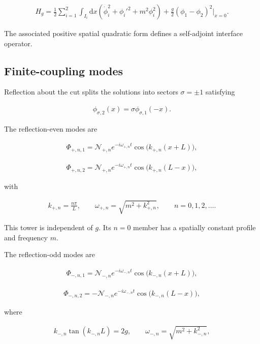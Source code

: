 \begin{align}
H_g
=\frac12\sum_{i=1}^2\int_{I_i}\mathrm dx
\left(\dot\phi_i^2+\phi_i'^2+m^2\phi_i^2\right)
+\frac g2(\phi_1-\phi_2)^2\big|_{x=0}.
\end{align}

The associated positive spatial quadratic form defines a self-adjoint interface operator.

\subsection{Finite-coupling modes}\label{subsec:interval-modes}

Reflection about the cut splits the solutions into sectors $\sigma=\pm1$ satisfying

\begin{align}
\phi_{\sigma,2}(x)=\sigma\phi_{\sigma,1}(-x).
\end{align}

The reflection-even modes are

\begin{align}
\Phi_{+,n,1}
=\mathcal N_{+,n}e^{-i\omega_{+,n}t}
\cos\bigl(k_{+,n}(x+L)\bigr),
\end{align}

\begin{align}
\Phi_{+,n,2}
=\mathcal N_{+,n}e^{-i\omega_{+,n}t}
\cos\bigl(k_{+,n}(L-x)\bigr),
\end{align}

with

\begin{align}
k_{+,n}=\frac{n\pi}{L},
\qquad
\omega_{+,n}=\sqrt{m^2+k_{+,n}^2},
\qquad
n=0,1,2,\ldots.
\end{align}

This tower is independent of $g$. Its $n=0$ member has a spatially constant profile and frequency $m$.

The reflection-odd modes are

\begin{align}
\Phi_{-,n,1}
=\mathcal N_{-,n}e^{-i\omega_{-,n}t}
\cos\bigl(k_{-,n}(x+L)\bigr),
\end{align}

\begin{align}
\Phi_{-,n,2}
=-\mathcal N_{-,n}e^{-i\omega_{-,n}t}
\cos\bigl(k_{-,n}(L-x)\bigr),
\end{align}

where

\begin{align}
k_{-,n}\tan(k_{-,n}L)=2g,
\qquad
\omega_{-,n}=\sqrt{m^2+k_{-,n}^2},
\end{align}

